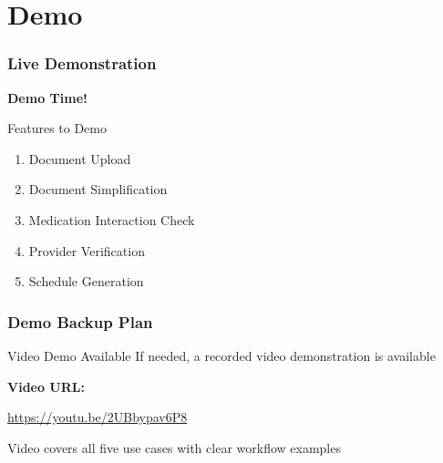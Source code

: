 \documentclass{beamer}
\begin{document}
\section{Demo}
\begin{frame}
  \frametitle{Live Demonstration}
  
  \begin{center}
    \Huge\bfseries Demo Time!
  \end{center}
  
  \vspace{1cm}
  
  \begin{block}{\textcolor{rxwhite}{Features to Demo}}
    \begin{enumerate}
      \item Document Upload
      \item Document Simplification
      \item Medication Interaction Check
      \item Provider Verification
      \item Schedule Generation
    \end{enumerate}
  \end{block}
\end{frame}

\begin{frame}
  \frametitle{Demo Backup Plan}
  
  \begin{alertblock}{Video Demo Available}
    If needed, a recorded video demonstration is available
  \end{alertblock}
  
  \vspace{0.5cm}
  
  \begin{center}
    \Large\textbf{Video URL:}
    
    \url{https://youtu.be/2UBbypav6P8}
  \end{center}
  
  \vspace{0.5cm}
  
  \begin{center}
    \footnotesize{Video covers all five use cases with clear workflow examples}
  \end{center}
\end{frame}

\end{document}
